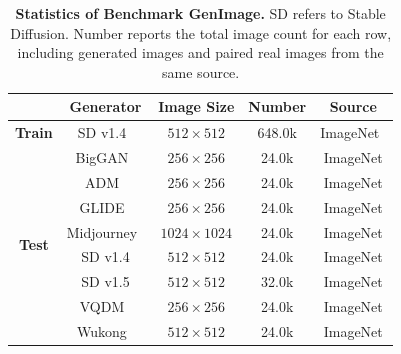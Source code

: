 \documentclass[lettersize,journal]{IEEEtran}
\begin{document}
\begin{table}[!htb]
\caption{\textbf{Statistics of Benchmark GenImage.} SD refers to Stable Diffusion. Number reports the total image count for each row, including generated images and paired real images from the same source.}
\label{tab:appendix_genimage_statistics}
\centering
\small
\renewcommand{\arraystretch}{1.04}
\setlength{\tabcolsep}{12pt}
\begin{tabular}{@{}c|cccc@{}}
\toprule
& \textbf{Generator} & \textbf{Image Size} & \textbf{Number} & \textbf{Source} \\
\midrule
\textbf{Train} & SD v1.4~\cite{rombach2022ldm} & $512\times512$ & 648.0k & ImageNet~\cite{deng2009imagenet} \\
\midrule
\multirow{8}{*}{\textbf{Test}}
& BigGAN~\cite{brock2019biggan} & $256\times256$ & 24.0k & ImageNet \\
& ADM~\cite{dhariwal2021diffusion} & $256\times256$ & 24.0k & ImageNet \\
& GLIDE~\cite{nichol2022glide} & $256\times256$ & 24.0k & ImageNet \\
& Midjourney~\cite{midjourney2023} & $1024\times1024$ & 24.0k & ImageNet \\
& SD v1.4 & $512\times512$ & 24.0k & ImageNet \\
& SD v1.5 & $512\times512$ & 32.0k & ImageNet \\
& VQDM~\cite{gu2022vqdm} & $256\times256$ & 24.0k & ImageNet \\
& Wukong~\cite{wukong2023} & $512\times512$ & 24.0k & ImageNet \\
\bottomrule
\end{tabular}
\end{table}
\end{document}
